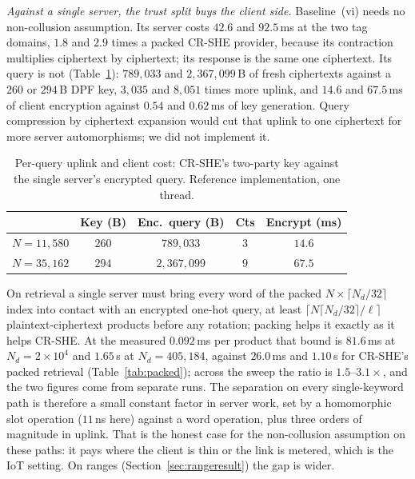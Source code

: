 \documentclass[a4paper,fleqn]{cas-sc}
\begin{document}
\emph{Against a single server, the trust split buys the client side.}
Baseline~(vi) needs no non-collusion assumption. Its server costs $42.6$ and
$92.5$\,ms at the two tag domains, $1.8$ and $2.9$ times a packed CR-SHE
provider, because its contraction multiplies ciphertext by ciphertext; its
response is the same one ciphertext. Its query is not (Table~\ref{tab:uplink}):
$789{,}033$ and $2{,}367{,}099$\,B of fresh ciphertexts against a $260$ or
$294$\,B DPF key, $3{,}035$ and $8{,}051$ times more uplink, and $14.6$ and
$67.5$\,ms of client encryption against $0.54$ and $0.62$\,ms of key
generation. Query compression by ciphertext expansion \citep{angel2018pir}
would cut that uplink to one ciphertext for more server automorphisms; we did
not implement it.

\begin{table}[pos=htbp]
\caption{Per-query uplink and client cost: CR-SHE's two-party key against the
single server's encrypted query. Reference implementation, one thread.}
\label{tab:uplink}
\centering
\footnotesize
\setlength{\tabcolsep}{3pt}
\begin{tabular*}{\tblwidth}{@{\extracolsep{\fill}}lcccc@{}}
\toprule
 & Key (B) & Enc.\ query (B) & Cts & Encrypt (ms) \\
\midrule
$N=11{,}580$ & $260$ & $789{,}033$ & $3$ & $14.6$ \\
$N=35{,}162$ & $294$ & $2{,}367{,}099$ & $9$ & $67.5$ \\
\bottomrule
\end{tabular*}
\end{table}

On retrieval a single server must bring every word of the packed
$N\times\lceil N_d/32\rceil$ index into contact with an encrypted one-hot
query, at least $\lceil N\lceil N_d/32\rceil/\ell\rceil$ plaintext-ciphertext
products before any rotation; packing helps it exactly as it helps CR-SHE. At
the measured $0.092$\,ms per product that bound is $81.6$\,ms at
$N_d=2\times10^4$ and $1.65$\,s at $N_d=405{,}184$, against $26.0$\,ms and
$1.10$\,s for CR-SHE's packed retrieval (Table~\ref{tab:packed}); across the
sweep the ratio is $1.5$--$3.1\times$, and the two figures come from separate
runs. The separation on every single-keyword path is therefore a small constant
factor in server work, set by a homomorphic slot operation ($11$\,ns here)
against a word operation, plus three orders of magnitude in uplink. That is the
honest case for the non-collusion assumption on these paths: it pays where the
client is thin or the link is metered, which is the IoT setting. On ranges
(Section~\ref{sec:rangeresult}) the gap is wider.
\end{document}
